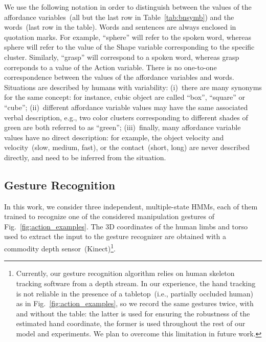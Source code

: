 We use the following notation in order to distinguish between the values of the affordance variables~(all but the last row in Table~\ref{tab:bnsymb}) and the words~(last row in the table).
Words and sentences are always enclosed in quotation marks.
For example, ``sphere'' will refer to the spoken word, whereas sphere will refer to the value of the Shape variable corresponding to the specific cluster.
Similarly, ``grasp'' will correspond to a spoken word, whereas grasp correponds to a value of the Action variable.
There is no one-to-one correspondence between the values of the affordance variables and words.
Situations are described by humans with variability:
(i)~there are many synonyms for the same concept: for instance, cubic object are called ``box'', ``square'' or ``cube'';
(ii)~different affordance variable values may have the same associated verbal description, e.g., two color clusters corresponding to different shades of green are both referred to as ``green'';
(iii)~finally, many affordance variable values have no direct description: for example, the object velocity and \objecthand{} velocity~(slow, medium, fast), or the \objecthand{} contact~(short, long) are never described directly, and need to be inferred from the situation.

\subsection{Gesture Recognition}
\label{sec:experimental_settings:gesture_recognition}
In this work, we consider three independent, multiple-state \aclp{HMM}, each of them trained to recognize one of the considered manipulation gestures of  Fig.~\ref{fig:action_examples}.
The 3D coordinates of the human limbs and torso used to extract the input to the gesture recognizer are obtained with a commodity depth sensor~(Kinect)\footnote{Currently, our gesture recognition algorithm relies on human skeleton tracking software from a depth stream.
In our experience, the hand tracking is not reliable in the presence of a tabletop~(i.e., partially occluded human) as in Fig.~\ref{fig:action_examples}, so we record the same gestures twice, with and without the table: the latter is used for ensuring the robustness of the estimated hand coordinate, the former is used throughout the rest of our model and experiments.
We plan to overcome this limitation in future work.}.
